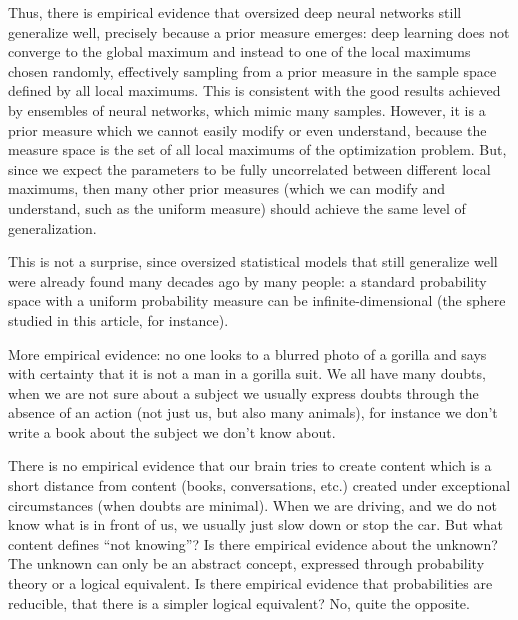 \documentclass[11pt]{book}
\begin{document}
Thus, there is empirical evidence that oversized deep neural networks
still generalize well, precisely because a prior measure emerges: deep
learning does not converge to the global maximum and instead to one of
the local maximums chosen randomly, effectively sampling from a prior
measure in the sample space defined by all local maximums. This is
consistent with the good results achieved by ensembles of neural
networks\cite{lakshminarayanan2017simple}\cite{egele2022autodeuq},
which mimic many samples. However, it is a prior measure which we cannot
easily modify or even understand, because the measure space is the set
of all local maximums of the optimization problem. But, since we expect
the parameters to be fully uncorrelated between different local
maximums, then many other prior measures (which we can modify and
understand, such as the uniform measure) should achieve the same level
of generalization.

This is not a surprise, since oversized statistical models that still
generalize well were already found many decades ago by many
people\cite{Peterson2019GaussianLA}: a
standard probability space with a uniform probability measure can be
infinite-dimensional (the
sphere\cite{Peterson2019GaussianLA}
studied in this article, for instance).

More empirical evidence: no one looks to a blurred photo of a gorilla
and says with certainty that it is not a man in a gorilla suit. We all
have many doubts, when we are not sure about a subject we usually
express doubts through the absence of an action (not just us, but also
many animals), for instance we don't write a book about the subject we
don't know about.

There is no empirical evidence that our brain tries to create content
which is a short distance from content (books, conversations, etc.)
created under exceptional circumstances (when doubts are minimal). When
we are driving, and we do not know what is in front of us, we usually
just slow down or stop the car. But what content defines ``not
knowing''? Is there empirical evidence about the unknown? The unknown
can only be an abstract concept, expressed through probability theory or
a logical equivalent. Is there empirical evidence that probabilities are
reducible, that there is a simpler logical equivalent? No, quite the
opposite.
\end{document}
